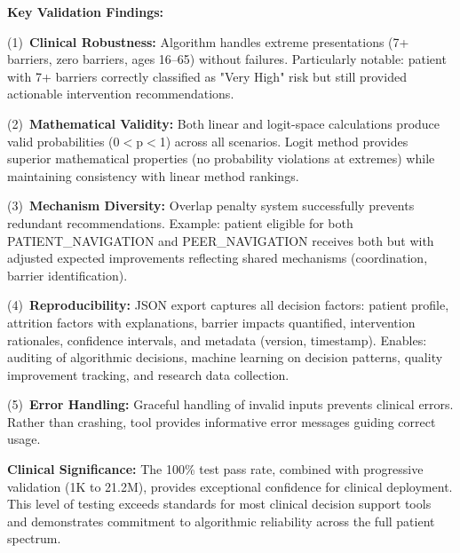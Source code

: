 \textbf{Key Validation Findings:}

(1)~\textbf{Clinical Robustness:} Algorithm handles extreme presentations (7+ barriers, zero barriers, ages 16--65) without failures. Particularly notable: patient with 7+ barriers correctly classified as "Very High" risk but still provided actionable intervention recommendations.

(2)~\textbf{Mathematical Validity:} Both linear and logit-space calculations produce valid probabilities (0$<$p$<$1) across all scenarios. Logit method provides superior mathematical properties (no probability violations at extremes) while maintaining consistency with linear method rankings.

(3)~\textbf{Mechanism Diversity:} Overlap penalty system successfully prevents redundant recommendations. Example: patient eligible for both PATIENT\_NAVIGATION and PEER\_NAVIGATION receives both but with adjusted expected improvements reflecting shared mechanisms (coordination, barrier identification).

(4)~\textbf{Reproducibility:} JSON export captures all decision factors: patient profile, attrition factors with explanations, barrier impacts quantified, intervention rationales, confidence intervals, and metadata (version, timestamp). Enables: auditing of algorithmic decisions, machine learning on decision patterns, quality improvement tracking, and research data collection.

(5)~\textbf{Error Handling:} Graceful handling of invalid inputs prevents clinical errors. Rather than crashing, tool provides informative error messages guiding correct usage.

\textbf{Clinical Significance:} The 100\% test pass rate, combined with progressive validation (1K to 21.2M), provides exceptional confidence for clinical deployment. This level of testing exceeds standards for most clinical decision support tools and demonstrates commitment to algorithmic reliability across the full patient spectrum.



